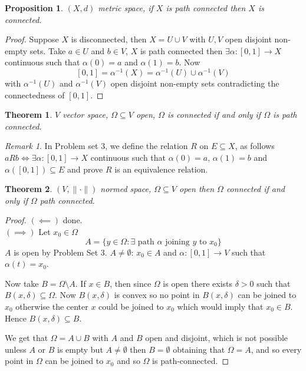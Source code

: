 \documentclass[11pt,openany]{book}
\theoremstyle{plain}
\newtheorem{theorem}{Theorem}[chapter]
\newtheorem{proposition}{Proposition}[chapter]
\theoremstyle{definition}
\theoremstyle{remark}
\newtheorem{remark}{Remark}[chapter]
\newcommand{\Om}{\Omega}
\begin{document}
\begin{proposition}
    $(X,d)$ metric space, if $X$ is path connected then $X$ is connected.
\end{proposition}

\begin{proof}
    Suppose $X$ is disconnected, then $X = U \cup V$ with $U,V$ open disjoint non-empty sets. Take $a \in U$ and $b \in V$, $X$ is path connected then $\exists \alpha: [0,1] \to X$ continuous such that $\alpha(0)=a$ and $\alpha(1) = b$. 
    Now 
    $$[0,1] = \alpha^{-1}(X) = \alpha^{-1}(U) \cup \alpha^{-1}(V)$$
    with $\alpha^{-1}(U)$ and $\alpha^{-1}(V)$ open disjoint non-empty sets contradicting the connectedness of $[0,1]$.
\end{proof}

\begin{theorem}
    $V$ vector space, $ \Om \subseteq V$ open, $\Om$ is connected if and only if $\Om$ is path connected.
\end{theorem}


\begin{remark}
    In Problem set 3, we  define the relation $R$ on $E\subseteq X$, as follows $aRb \iff \exists \alpha : [0,1] \to X$ continuous such that $\alpha(0) = a$, $\alpha(1) = b$ and $\alpha([0,1]) \subseteq E$ and prove $R$ is an equivalence relation.
\end{remark}

\begin{theorem}
    $(V, \|\cdot\|)$ normed space, $\Om \subseteq V$ open then $\Om$ connected if and only if $\Om$ path connected.
\end{theorem}

\begin{proof}
    $(\impliedby) $ done.
    \\
    $(\implies)$ Let $x_0 \in \Om$ \[A = \{y \in \Om: \exists \text{ path } \alpha \text{ joining } y \text{ to } x_0\}\] $A$ is open by Problem Set 3. $A \ne \emptyset$: $x_0 \in A$ and $\alpha:[0,1] \to V$ such that $\alpha(t) = x_0$. 
    
    
    Now take $B=\Omega\setminus A$. If $x\in B$, then since $\Omega$ is open there exists $\delta>0$ such that $B(x,\delta)\subseteq \Omega$. Now $B(x,\delta)$ is convex so no point in $B(x,\delta)$ can be joined to $x_0$ otherwise the center $x$ could be joined to $x_0$ which would imply that $x_0\in B$. Hence $B(x,\delta)\subseteq B$.

    We get that $\Omega=A\cup B$ with $A$ and $B$ open and disjoint, which is not possible unless $A$ or $B$ is empty but $A\neq \emptyset$ then $B=\emptyset$ obtaining that $\Omega=A$, and so every point in $\Omega$ can be joined to $x_0$ and so $\Omega$ is path-connected.
    
\end{proof}
\end{document}
